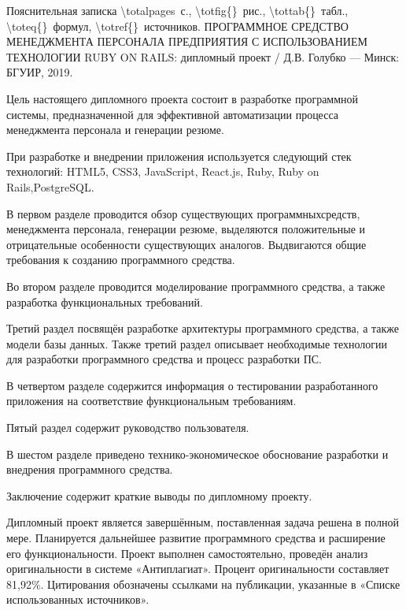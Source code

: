 \thispagestyle{empty}


\begin{center}
	Пояснительная записка \num{\totalpages}~с., \num{\totfig{}}~рис., \num{\tottab{}}~табл., \num{\toteq{}}~формул, \num{\totref{}}~источников.
	\MakeUppercase{Программное средство менеджмента персонала предприятия с использованием технологии Ruby on Rails}: 
	дипломный проект / Д.В. Голубко --- Минск: БГУИР, 2019.
\end{center}

Цель настоящего дипломного проекта состоит в разработке программной системы, предназначенной для эффективной
автоматизации процесса менеджмента персонала и генерации резюме. 

При разработке и внедрении приложения используется следующий стек технологий: HTML5, CSS3, JavaScript, React.js,
Ruby, Ruby on Rails,\linebreak PostgreSQL.

В первом разделе проводится обзор существующих программных\linebreak средств, менеджмента персонала, генерации резюме,
выделяются положительные и отрицательные особенности существующих аналогов.
Выдвигаются общие требования к созданию программного средства.

Во втором разделе проводится моделирование программного средства, а также разработка функциональных требований.

Третий раздел посвящён разработке архитектуры программного средства, а также модели базы данных.
Также третий раздел описывает необходимые технологии для разработки программного средства и процесс разработки ПС.

В четвертом разделе содержится информация о тестировании разработанного приложения на соответствие функциональным требованиям.

Пятый раздел содержит руководство пользователя.

В шестом разделе приведено технико-экономическое обоснование разработки и внедрения программного средства.

Заключение содержит краткие выводы по дипломному проекту.

Дипломный проект является завершённым, поставленная задача решена в полной мере. Планируется дальнейшее развитие
программного средства и расширение его функциональности. Проект выполнен самостоятельно, проведён анализ оригинальности
в системе «Антиплагиат». Процент оригинальности составляет 81,92\%. Цитирования обозначены ссылками на публикации,
указанные в «Списке использованных источников».
